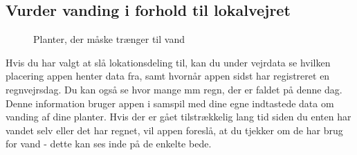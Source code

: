 \subsection{Vurder vanding i forhold til lokalvejret}
\begin{minipage}{0.4\textwidth}
\begin{figure}[H]
    \centering
    \caption{Planter, der måske trænger til vand}
\end{figure}
\end{minipage} \hfill
\begin{minipage}{0.55\textwidth}
Hvis du har valgt at slå lokationsdeling til, kan du under vejrdata se hvilken placering appen henter data fra, samt hvornår appen sidst har registreret en regnvejrsdag. Du kan også se hvor mange mm regn, der er faldet på denne dag. Denne information bruger appen i samspil med dine egne indtastede data om vanding af dine planter. Hvis der er gået tilstrækkelig lang tid siden du enten har vandet selv eller det har regnet, vil appen foreslå, at du tjekker om de har brug for vand - dette kan ses inde på de enkelte bede.
\end{minipage} 
